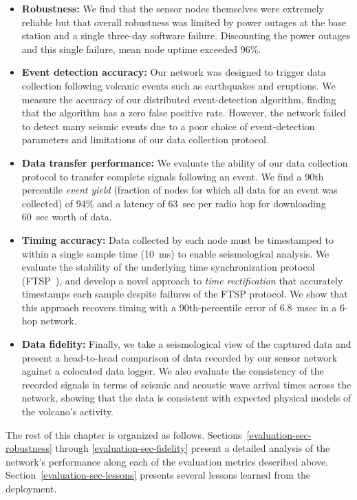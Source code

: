 \begin{itemize}

\item \textbf{Robustness:} We find that the sensor nodes themselves were
extremely reliable but that overall robustness was limited by power outages
at the base station and a single three-day software failure. Discounting the
power outages and this single failure, mean node uptime exceeded 96\%.

\item \textbf{Event detection accuracy:} Our network was designed to trigger
data collection following volcanic events such as earthquakes and eruptions.
We measure the accuracy of our distributed event-detection algorithm, finding
that the algorithm has a zero false positive rate. However, the network
failed to detect many seismic events due to a poor choice of event-detection
parameters and limitations of our data collection protocol.

\item \textbf{Data transfer performance:} We evaluate the ability of our data
collection protocol to transfer complete signals following an event. We find
a 90th percentile \textit{event yield} (fraction of nodes for which all data
for an event was collected) of 94\% and a latency of 63~sec per radio hop for
downloading 60~sec worth of data.

\item \textbf{Timing accuracy:} Data collected by each node must be
timestamped to within a single sample time (10~ms) to enable seismological
analysis. We evaluate the stability of the underlying time synchronization
protocol (FTSP~\cite{ftsp}), and develop a novel approach to \textit{time
rectification} that accurately timestamps each sample despite failures of the
FTSP protocol. We show that this approach recovers timing with a
90th-percentile error of 6.8~msec in a 6-hop network.

\item \textbf{Data fidelity:} Finally, we take a seismological view of the
captured data and present a head-to-head comparison of data recorded by our
sensor network against a colocated data logger. We also evaluate the
consistency of the recorded signals in terms of seismic and acoustic wave
arrival times across the network, showing that the data is consistent with
expected physical models of the volcano's activity.

\end{itemize}


The rest of this chapter is organized as follows.
Sections~\ref{evaluation-sec-robustness} through
\ref{evaluation-sec-fidelity} present a detailed analysis of the network's
performance along each of the evaluation metrics described above.
Section~\ref{evaluation-sec-lessons} presents several lessons learned from
the deployment.
